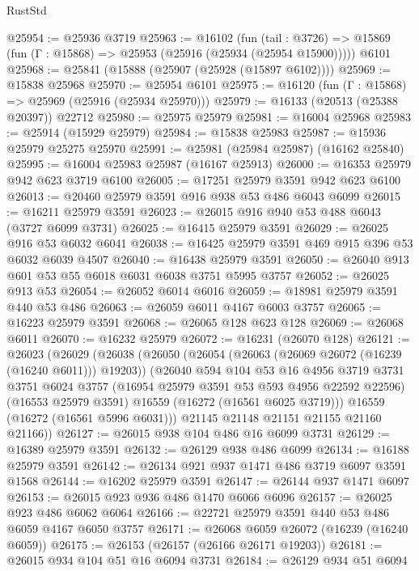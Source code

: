 \begin{lexlean}{RustStd}
\begin{coremodule}
@25954 := @25936 @3719
@25963 := @16102
    (fun (tail : @3726) => @15869 (fun (Γ : @15868) => @25953 (@25916 (@25934 (@25954 @15900)))))
    @6101
@25968 := @25841 (@15888 (@25907 (@25928 (@15897 @6102))))
@25969 := @15838 @25968
@25970 := @25954 @6101
@25975 := @16120 (fun (Γ : @15868) => @25969 (@25916 (@25934 @25970)))
@25979 := @16133 (@20513 (@25388 @20397)) @22712
@25980 := @25975 @25979
@25981 := @16004 @25968
@25983 := @25914 (@15929 @25979)
@25984 := @15838 @25983
@25987 := @15936 @25979 @25275 @25970
@25991 := @25981 (@25984 @25987) (@16162 @25840)
@25995 := @16004 @25983 @25987 (@16167 @25913)
@26000 := @16353 @25979 @942 @623 @3719 @6100
@26005 := @17251 @25979 @3591 @942 @623 @6100
@26013 := @20460 @25979 @3591 @916 @938 @53 @486 @6043 @6099
@26015 := @16211 @25979 @3591
@26023 := @26015 @916 @940 @53 @488 @6043 (@3727 @6099 @3731)
@26025 := @16415 @25979 @3591
@26029 := @26025 @916 @53 @6032 @6041
@26038 := @16425 @25979 @3591 @469 @915 @396 @53 @6032 @6039 @4507
@26040 := @16438 @25979 @3591
@26050 := @26040 @913 @601 @53 @55 @6018 @6031 @6038 @3751 @5995 @3757
@26052 := @26025 @913 @53
@26054 := @26052 @6014 @6016
@26059 := @18981 @25979 @3591 @440 @53 @486
@26063 := @26059 @6011 @4167 @6003 @3757
@26065 := @16223 @25979 @3591
@26068 := @26065 @128 @623 @128
@26069 := @26068 @6011
@26070 := @16232 @25979
@26072 := @16231 (@26070 @128)
@26121 := @26023
    (@26029
      (@26038
        (@26050
          (@26054 (@26063 (@26069 @26072 (@16239 (@16240 @6011))) @19203))
          (@26040
            @594
            @104
            @53
            @16
            @4956
            @3719
            @3731
            @3751
            @6024
            @3757
            (@16954 @25979 @3591 @53 @593 @4956 @22592 @22596)
            (@16553 @25979 @3591)
            @16559
            (@16272 (@16561 @6025 @3719)))
          @16559
          (@16272 (@16561 @5996 @6031)))
        @21145
        @21148
        @21151
        @21155
        @21160
        @21166))
@26127 := @26015 @938 @104 @486 @16 @6099 @3731
@26129 := @16389 @25979 @3591
@26132 := @26129 @938 @486 @6099
@26134 := @16188 @25979 @3591
@26142 := @26134 @921 @937 @1471 @486 @3719 @6097 @3591 @1568
@26144 := @16202 @25979 @3591
@26147 := @26144 @937 @1471 @6097
@26153 := @26015 @923 @936 @486 @1470 @6066 @6096
@26157 := @26025 @923 @486 @6062 @6064
@26166 := @22721 @25979 @3591 @440 @53 @486 @6059 @4167 @6050 @3757
@26171 := @26068 @6059 @26072 (@16239 (@16240 @6059))
@26175 := @26153 (@26157 (@26166 @26171 @19203))
@26181 := @26015 @934 @104 @51 @16 @6094 @3731
@26184 := @26129 @934 @51 @6094

\end{coremodule}
\end{lexlean}
